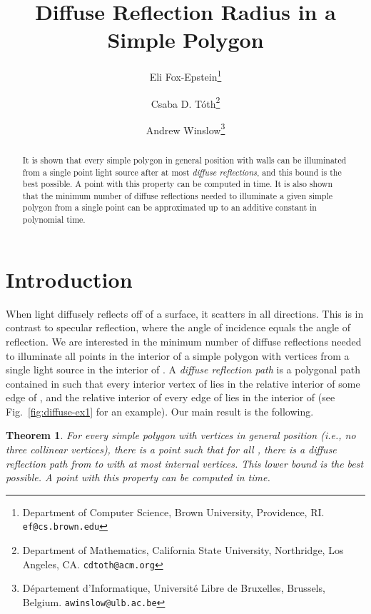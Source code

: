 \documentclass[12pt]{article}
\newtheorem{theorem}{Theorem}
\begin{document}
\title{Diffuse Reflection Radius in a Simple Polygon}
\author{
  Eli Fox-Epstein\thanks{Department of Computer Science, Brown University, Providence, RI. \texttt{ef@cs.brown.edu}} \and
  Csaba D. T\'oth\thanks{Department of Mathematics, California State University, Northridge, Los Angeles, CA. \texttt{cdtoth@acm.org}} \and
  Andrew Winslow\thanks{D\'{e}partement d'Informatique, Universit\'{e} Libre de Bruxelles, Brussels, Belgium. \texttt{awinslow@ulb.ac.be}}
}\date{}
\maketitle

\begin{abstract}
It is shown that every simple polygon in general position with  walls can be illuminated from a single point light source  after at most  \emph{diffuse reflections}, and this bound is the best possible. A point  with this property can be computed in  time.
It is also shown that the minimum number of diffuse reflections needed to illuminate a given simple polygon from a single point can be approximated up to an additive constant in polynomial time.
\end{abstract}

\section{Introduction}
When light diffusely reflects off of a surface, it scatters in all directions.
This is in contrast to specular reflection,
  where the angle of incidence equals the angle of reflection.
We are interested in the minimum number of diffuse reflections needed to illuminate all points in the interior of a simple polygon  with  vertices from a single light source  in the interior of .
A \emph{diffuse reflection path} is a polygonal path  contained in  such that every interior vertex of  lies in the relative interior of some edge of , and the relative interior of every edge of  lies in the interior of  (see Fig.~\ref{fig:diffuse-ex1} for an example). Our main result is the following.

\begin{theorem}\label{thm:radius}
For every simple polygon  with  vertices in general position (i.e., no three collinear vertices), there is a point  such that for all ,
  there is a diffuse reflection path from  to  with at most  internal vertices.
This lower bound is the best possible.
A point  with this property can be computed in  time.
\end{theorem}
\end{document}
